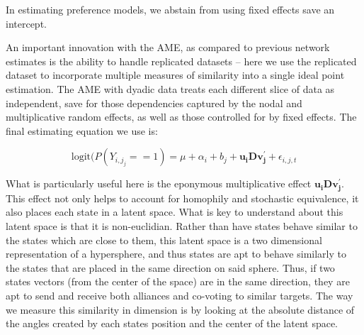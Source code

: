 In estimating preference models, we abstain from using fixed effects save an intercept.

An important innovation with the AME, as compared to previous network estimates is the ability to handle replicated datasets -- here we use the replicated dataset to incorporate multiple measures of similarity into a single ideal point estimation.  The AME with dyadic data treats each different slice of data as independent, save for those dependencies captured by the nodal and multiplicative random effects, as well as those controlled for by fixed effects. The final estimating equation we use is:

\begin{equation}
	\text{logit}(P(Y_{i,j_j} == 1) = \mu + \alpha_{i} + b_{j} + \mathbf{u_{i}Dv^{'}_{j}} + \epsilon_{i,j,t}
\end{equation}

What is particularly useful here is the eponymous multiplicative effect $\mathbf{u_{i}Dv^{'}_{j}}$. This effect not only helps to account for homophily and stochastic equivalence, it also places each state in a latent space. What is key to understand about this latent space is that it is non-euclidian. Rather than have states behave similar to the states which are close to them, this latent space is a two dimensional representation of a hypersphere, and thus states are apt to behave similarly to the states that are placed in the same direction on said sphere. Thus, if two states vectors (from the center of the space) are in the same direction, they are apt to send and receive both alliances and co-voting to similar targets. The way we measure this similarity in dimension is by looking at the absolute distance of the angles created by each states position and the center of the latent space. 


